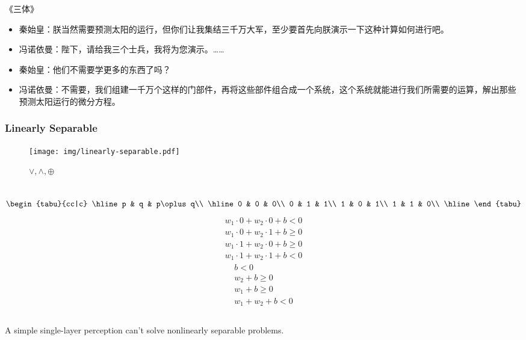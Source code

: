 \documentclass[UTF8,11pt,colorlinks,compress,openany]{beamer}%
\begin{document}
\begin{frame}\frametitle{}
\begin{block}{《三体》}
\begin{itemize}
	\item 秦始皇：朕当然需要预测太阳的运行，但你们让我集结三千万大军，至少要首先向朕演示一下这种计算如何进行吧。
	\item 冯诺依曼：陛下，请给我三个士兵，我将为您演示。……
	\item 秦始皇：他们不需要学更多的东西了吗？
	\item 冯诺依曼：不需要，我们组建一千万个这样的门部件，再将这些部件组合成一个系统，这个系统就能进行我们所需要的运算，解出那些预测太阳运行的微分方程。
\end{itemize}
\end{block}
\end{frame}

\begin{frame}\frametitle{Linearly Separable}
\begin{figure}[H]
\texttt{[image: img/linearly-separable.pdf]}\caption{$\vee,\wedge,\oplus$}
\end{figure}
\begin{columns}	
\[\begin{tabu}{cc|c}
	\hline
	p & q & p\oplus q\\
	\hline
	0 & 0 & 0\\
	0 & 1 & 1\\
	1 & 0 & 1\\
	1 & 1 & 0\\
	\hline
\end{tabu}\]
\begin{align*}
w_1\cdot 0+w_2\cdot 0+b<0\\
w_1\cdot 0+w_2\cdot 1+b\geq 0\\
w_1\cdot 1+w_2\cdot 0+b\geq 0\\
w_1\cdot 1+w_2\cdot 1+b<0
\end{align*}
\begin{align*}
b<0\\
w_2+b\geq 0\\
w_1+b\geq 0\\
w_1+w_2+b<0
\end{align*}
\end{columns}\vspace*{7pt}
A simple single-layer perception can't solve nonlinearly separable problems.
\end{frame}
\end{document}
